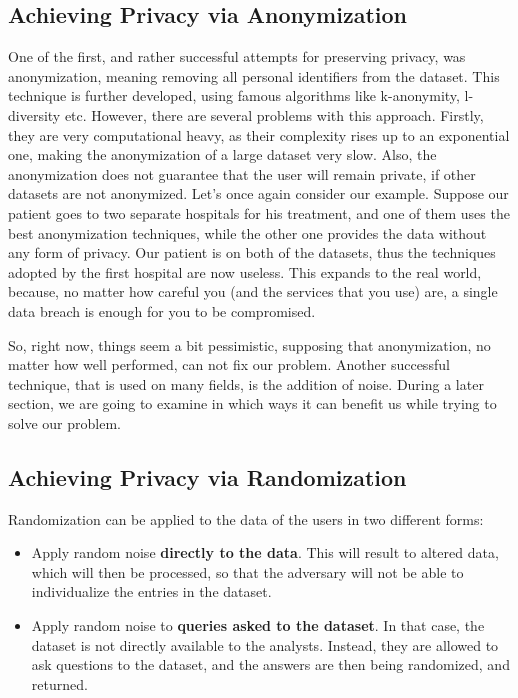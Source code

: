 \subsection{Achieving Privacy via Anonymization}

\par One of the first, and rather successful attempts for preserving privacy, was anonymization, meaning removing all personal identifiers from the dataset. This technique is further developed, using famous algorithms like k-anonymity, l-diversity etc. However, there are several problems with this approach. Firstly, they are very computational heavy, as their complexity rises up to an exponential one, making the anonymization of a large dataset very slow. Also, the anonymization does not guarantee that the user will remain private, if other datasets are not anonymized. Let's once again consider our example. Suppose our patient goes to two separate hospitals for his treatment, and one of them uses the best anonymization techniques, while the other one provides the data without any form of privacy. Our patient is on both of the datasets, thus the techniques adopted by the first hospital are now useless. This expands to the real world, because, no matter how careful you (and the services that you use) are, a single data breach is enough for you to be compromised. 

\par So, right now, things seem a bit pessimistic, supposing that anonymization, no matter how well performed, can not fix our problem. Another successful technique, that is used on many fields, is the addition of noise. During a later section, we are going to examine in which ways it can benefit us while trying to solve our problem.

\subsection{Achieving Privacy via Randomization}

Randomization can be applied to the data of the users in two different forms:
\begin{itemize}
    \item Apply random noise \textbf{directly to the data}. This will result to altered data, which will then be processed, so that the adversary will not be able to individualize the entries in the dataset.
    \item Apply random noise to \textbf{queries asked to the dataset}. In that case, the dataset is not directly available to the analysts. Instead, they are allowed to ask questions to the dataset, and the answers are then being randomized, and returned.
\end{itemize}

